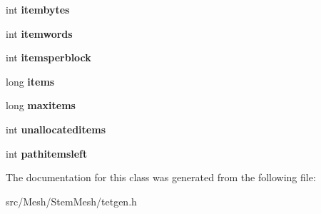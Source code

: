\begin{DoxyCompactItemize}
$$int {\bfseries itembytes}
\item 
\mbox{\label{classStemMesh3D_1_1tetgenmesh_1_1memorypool_ac0c9e25869e4e3bf10aa572b5b6c00a3}} 
int {\bfseries itemwords}
\item 
\mbox{\label{classStemMesh3D_1_1tetgenmesh_1_1memorypool_a79cb03231d42d02bfd179c1bac49b01b}} 
int {\bfseries itemsperblock}
\item 
\mbox{\label{classStemMesh3D_1_1tetgenmesh_1_1memorypool_a552b8e444707f2972d5bdd9a4ca1f3ad}} 
long {\bfseries items}
\item 
\mbox{\label{classStemMesh3D_1_1tetgenmesh_1_1memorypool_a1daed841e64bd087556aa8a217cddb13}} 
long {\bfseries maxitems}
\item 
\mbox{\label{classStemMesh3D_1_1tetgenmesh_1_1memorypool_ac6329f4be8125e13557c6aacf14a6b5a}} 
int {\bfseries unallocateditems}
\item 
\mbox{\label{classStemMesh3D_1_1tetgenmesh_1_1memorypool_acb791b9c888ecc7d163f24cb4ba6794f}} 
int {\bfseries pathitemsleft}
\end{DoxyCompactItemize}


The documentation for this class was generated from the following file\+:\begin{DoxyCompactItemize}
\item 
src/\+Mesh/\+Stem\+Mesh/tetgen.\+h\end{DoxyCompactItemize}

